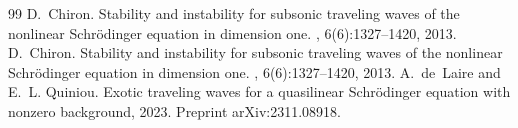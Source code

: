 \documentclass[10pt,a4paper]{amsart}
\begin{document}
\begin{thebibliography}{99}
 D.~Chiron. \newblock Stability and instability for subsonic traveling waves of the nonlinear {S}chr\"{o}dinger equation in dimension one. , 6(6):1327--1420, 2013.
 D.~Chiron. \newblock Stability and instability for subsonic traveling waves of the nonlinear {S}chr\"odinger equation in dimension one. , 6(6):1327--1420, 2013.
 A.~de~Laire and E.~L. Quiniou. \newblock Exotic traveling waves for a quasilinear {S}chr\"odinger equation with nonzero background, 2023. \newblock Preprint arXiv:2311.08918.
\end{thebibliography}
\end{document}
